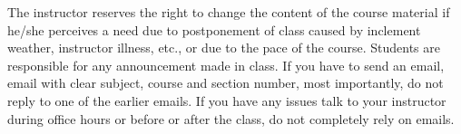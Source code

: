 \documentclass[11pt]{article}
\begin{document}
\vspace{.1in}
The instructor reserves the right to change the content of the course material if he/she perceives a need due to postponement of class caused by inclement weather, instructor illness, etc., or due to the pace of the course. Students are responsible for any announcement made in class. If you have to send an email, email with clear subject, course and section number, most importantly, do not reply to one of the earlier emails. If you have any issues talk to your instructor during office hours or before or after the class, do not completely rely on emails.
\end{document}
